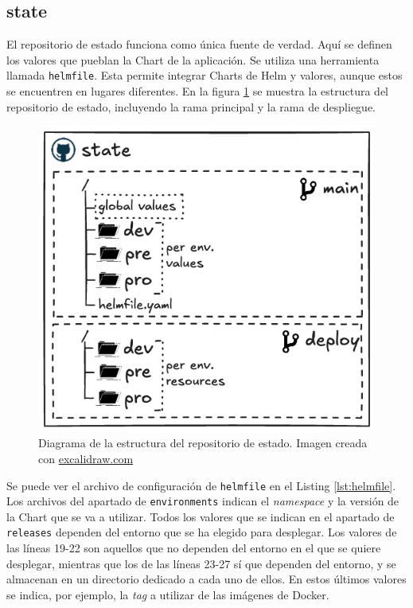 \subsection*{state}
\label{subsec:state}

El repositorio de estado funciona como única fuente de verdad. Aquí se definen  los valores que pueblan la Chart de la aplicación. Se utiliza una herramienta llamada \texttt{helmfile}\cite{helmfile}. Esta permite integrar Charts de Helm y valores, aunque estos se encuentren en lugares diferentes. En la figura \ref{fig:state} se muestra la estructura del repositorio de estado, incluyendo la rama principal y la rama de despliegue.

\begin{figure}[t]
  \centerline{\includegraphics[width=12cm]{figuras/state}}
  \caption{Diagrama de la estructura del repositorio de estado. Imagen creada con \href{https://excalidraw.com}{excalidraw.com}}
  \label{fig:state}
\end{figure}

Se puede ver el archivo de configuración de \texttt{helmfile} en el Listing \ref{lst:helmfile}. Los archivos del apartado de \texttt{environments} indican el \textit{namespace} y la versión de la Chart que se va a utilizar. Todos los valores que se indican en el apartado de \texttt{releases} dependen del entorno que se ha elegido para desplegar. Los valores de las líneas 19-22 son aquellos que no dependen del entorno en el que se quiere desplegar, mientras que los de las líneas 23-27 sí que dependen del entorno, y se almacenan en un directorio dedicado a cada uno de ellos. En estos últimos valores se indica, por ejemplo, la \textit{tag} a utilizar de las imágenes de Docker.

